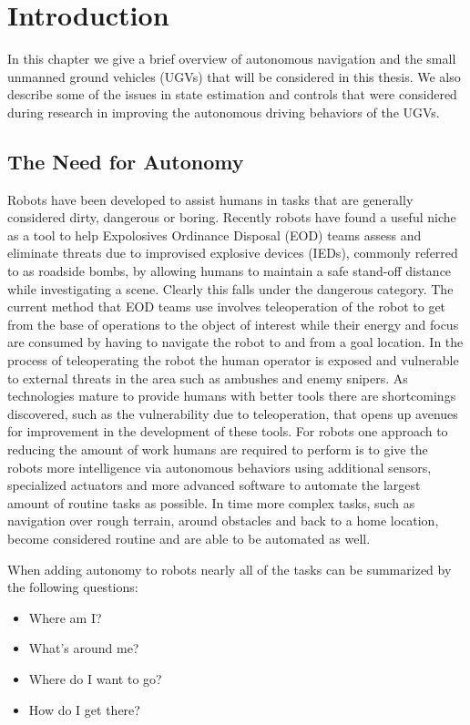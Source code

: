 \chapter{Introduction}
\label{ch:introduction}
In this chapter we give a brief overview of autonomous navigation and the small unmanned ground vehicles (UGVs) that will be considered in this thesis. We also describe some of the issues in state estimation and controls that were considered during research in improving the autonomous driving behaviors of the UGVs.

\section{The Need for Autonomy}
\label{sec:needforautonomy}
Robots have been developed to assist humans in tasks that are generally considered dirty, dangerous or boring. Recently robots have found a useful niche as a tool to help Expolosives Ordinance Disposal (EOD) teams assess and eliminate threats due to improvised explosive devices (IEDs), commonly referred to as roadside bombs, by allowing humans to maintain a safe stand-off distance while investigating a scene. Clearly this falls under the dangerous category. The current method that EOD teams use involves teleoperation of the robot to get from the base of operations to the object of interest while their energy and focus are consumed by having to navigate the robot to and from a goal location. In the process of teleoperating the robot the human operator is exposed and vulnerable to external threats in the area such as ambushes and enemy snipers. As technologies mature to provide humans with better tools there are shortcomings discovered, such as the vulnerability due to teleoperation, that opens up avenues for improvement in the development of these tools. For robots one approach to reducing the amount of work humans are required to perform is to give the robots more intelligence via autonomous behaviors using additional sensors, specialized actuators and more advanced software to automate the largest amount of routine tasks as possible. In time more complex tasks, such as navigation over rough terrain, around obstacles and back to a home location, become considered routine and are able to be automated as well.

When adding autonomy to robots nearly all of the tasks can be summarized by the following questions:
\begin{itemize}
\item Where am I?
\item What's around me?
\item Where do I want to go?
\item How do I get there?
\end{itemize}

